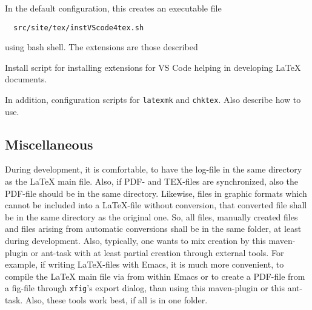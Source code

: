 \noindent
In the default configuration, this creates an executable file 
%
\begin{verbatim}
  src/site/tex/instVScode4tex.sh
\end{verbatim}
%
using bash shell. 
The extensions are those described 



Install script for installing extensions for VS Code 
helping in developing \LaTeX{} documents. 


In addition, configuration scripts for \texttt{latexmk} and \texttt{chktex}. 
Also describe how to use. 



\subsection{Miscellaneous}



During development, it is comfortable, 
to have the log-file in the same directory as the \LaTeX{} main file. 
Also, if PDF- and TEX-files are synchronized, 
also the PDF-file should be in the same directory. 
Likewise, files in graphic formats 
which cannot be included into a \LaTeX-file without conversion, 
that converted file shall be in the same directory as the original one. 
So, all files, manually created files 
and files arising from automatic conversions 
shall be in the same folder, at least during development. 
Also, typically, one wants to mix creation by this maven-plugin or ant-task 
with at least partial creation through external tools. 
For example, if writing \LaTeX-files with Emacs, 
it is much more convenient, to compile the \LaTeX{} main file 
via \pdflatex{} from within Emacs 
or to create a PDF-file from a \gls{fig}-file 
through \texttt{xfig}'s export dialog, 
than using this maven-plugin or this ant-task. 
Also, these tools work best, if all is in one folder. 

